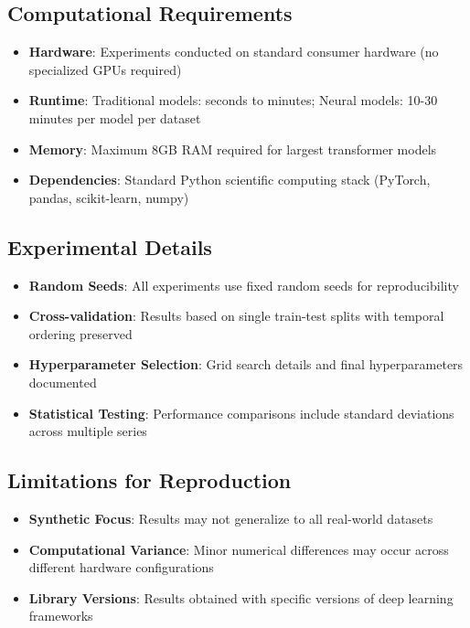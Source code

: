 \documentclass[11pt]{article}
\begin{document}
\subsection*{Computational Requirements}

\begin{itemize}
\item \textbf{Hardware}: Experiments conducted on standard consumer hardware (no specialized GPUs required)
\item \textbf{Runtime}: Traditional models: seconds to minutes; Neural models: 10-30 minutes per model per dataset
\item \textbf{Memory}: Maximum 8GB RAM required for largest transformer models
\item \textbf{Dependencies}: Standard Python scientific computing stack (PyTorch, pandas, scikit-learn, numpy)
\end{itemize}

\subsection*{Experimental Details}

\begin{itemize}
\item \textbf{Random Seeds}: All experiments use fixed random seeds for reproducibility
\item \textbf{Cross-validation}: Results based on single train-test splits with temporal ordering preserved
\item \textbf{Hyperparameter Selection}: Grid search details and final hyperparameters documented
\item \textbf{Statistical Testing}: Performance comparisons include standard deviations across multiple series
\end{itemize}

\subsection*{Limitations for Reproduction}

\begin{itemize}
\item \textbf{Synthetic Focus}: Results may not generalize to all real-world datasets
\item \textbf{Computational Variance}: Minor numerical differences may occur across different hardware configurations
\item \textbf{Library Versions}: Results obtained with specific versions of deep learning frameworks
\end{itemize}
\end{document}
